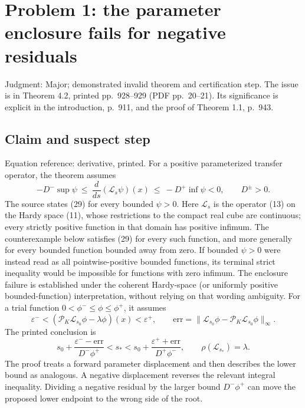 \documentclass[10pt]{article}
\begin{document}
\section*{Problem 1: the parameter enclosure fails for negative residuals}
Judgment: Major; demonstrated invalid theorem and certification step. The issue is in Theorem 4.2, printed pp. 928–929 (PDF pp. 20–21). Its significance is explicit in the introduction, p. 911, and the proof of Theorem 1.1, p. 943.\par
\subsection*{Claim and suspect step}
Equation reference: derivative, printed. For a positive parameterized transfer operator, the theorem assumes \[
-D^-\sup\psi\ \le\ \frac{d}{ds}(\mathcal L_s\psi)(x)\
 \le\ -D^+\inf\psi <0,
\qquad D^\pm>0.\] The source states (29) for every bounded \(\psi>0\). Here \(\mathcal L_s\) is the operator (13) on the Hardy space (11), whose restrictions to the compact real cube are continuous; every strictly positive function in that domain has positive infimum. The counterexample below satisfies (29) for every such function, and more generally for every bounded function bounded away from zero. If bounded \(\psi>0\) were instead read as all pointwise-positive bounded functions, its terminal strict inequality would be impossible for functions with zero infimum. The enclosure failure is established under the coherent Hardy-space (or uniformly positive bounded-function) interpretation, without relying on that wording ambiguity. For a trial function \(0<\phi^-\le\phi\le\phi^+\), it assumes \[\varepsilon^-<(\mathcal P_K\mathcal L_{s_0}\phi-\lambda\phi)(x)<\varepsilon^+,
 \qquad
 \mathrm{err}=\|\mathcal L_{s_0}\phi-\mathcal P_K\mathcal L_{s_0}\phi\|_\infty.\] The printed conclusion is \[
 s_0+\frac{\varepsilon^--\mathrm{err}}{D^-\phi^+}
 <s_*<
 s_0+\frac{\varepsilon^++\mathrm{err}}{D^+\phi^-},
 \qquad \rho(\mathcal L_{s_*})=\lambda.\] The proof treats a forward parameter displacement and then describes the lower bound as analogous. A negative displacement reverses the relevant integral inequality. Dividing a negative residual by the larger bound \(D^-\phi^+\) can move the proposed lower endpoint to the wrong side of the root.\par
\end{document}

